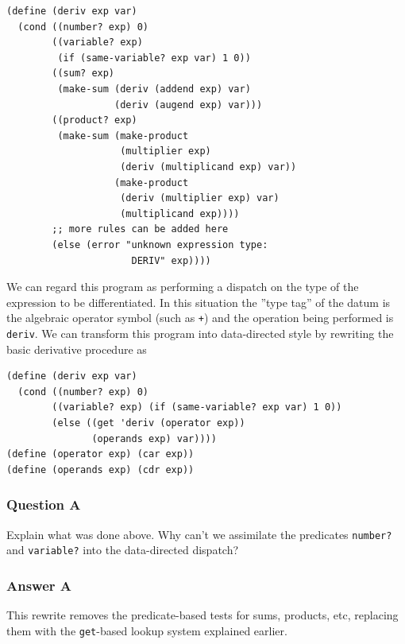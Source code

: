 \documentclass[final,fleqn,titlepage,twoside]{article}
\begin{document}
\begin{verbatim}
(define (deriv exp var)
  (cond ((number? exp) 0)
        ((variable? exp)
         (if (same-variable? exp var) 1 0))
        ((sum? exp)
         (make-sum (deriv (addend exp) var)
                   (deriv (augend exp) var)))
        ((product? exp)
         (make-sum (make-product
                    (multiplier exp)
                    (deriv (multiplicand exp) var))
                   (make-product
                    (deriv (multiplier exp) var)
                    (multiplicand exp))))
        ;; more rules can be added here
        (else (error "unknown expression type:
                      DERIV" exp))))
\end{verbatim}

We can regard this program as performing a dispatch on the type of the
expression to be differentiated. In this situation the ''type tag'' of the datum
is the algebraic operator symbol (such as \texttt{+}) and the operation being
performed is \texttt{deriv}. We can transform this program into data-directed
style by rewriting the basic derivative procedure as

\begin{verbatim}
(define (deriv exp var)
  (cond ((number? exp) 0)
        ((variable? exp) (if (same-variable? exp var) 1 0))
        (else ((get 'deriv (operator exp))
               (operands exp) var))))
(define (operator exp) (car exp))
(define (operands exp) (cdr exp))
\end{verbatim}

\subsubsection{Question A}
\label{sec:orgfcb9ba6}
Explain what was done above. Why can't we assimilate the predicates
\texttt{number?} and \texttt{variable?} into the data-directed dispatch?

\subsubsection{Answer A}
\label{sec:org638116e}
This rewrite removes the predicate-based tests for sums, products, etc,
replacing them with the \texttt{get}-based lookup system explained earlier.
\end{document}
